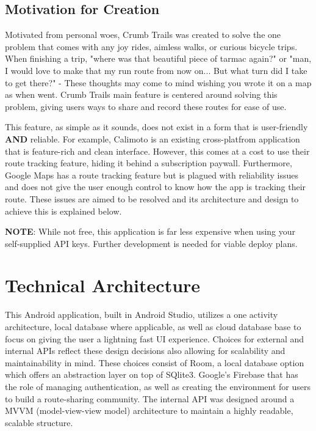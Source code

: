 \documentclass{article}
\begin{document}
            \newpage

        \subsection{Motivation for Creation}

            Motivated from personal woes, Crumb Trails was created to solve the one problem that comes
            with any joy rides, aimless walks, or curious bicycle trips. When finishing a trip, 
            "where was that beautiful piece of tarmac again?" or "man, I would love to make that my 
            run route from now on... But what turn did I take to get there?" - These thoughts may 
            come to mind wishing you wrote it on a map as when went. Crumb Trails main feature is
            centered around solving this problem, giving users ways to share and record these routes
            for ease of use.

            This feature, as simple as it sounds, does not exist in a form that is user-friendly
            \textbf{AND} reliable. For example, Calimoto is an existing cross-platfrom application
            that is feature-rich and clean interface. However, this comes at a cost to use their 
            route tracking feature, hiding it behind a subscription paywall. Furthermore, Google Maps
            has a route tracking feature but is plagued with reliability issues and does not give the 
            user enough control to know how the app is tracking their route. These issues are aimed to 
            be resolved and its architecture and design to achieve this is explained below.

            \textbf{NOTE}: While not free, this application is far less expensive when using your 
            self-supplied API keys. Further development is needed for viable deploy plans.

    \newpage

    \section{Technical Architecture}

        This Android application, built in Android Studio, utilizes a one activity architecture,
        local database where applicable, as well as cloud database base to focus on giving the user
        a lightning fast UI experience. Choices for external and internal APIs reflect these
        design decisions also allowing for scalability and maintainability in mind. These choices
        consist of Room, a local database option which offers an abstraction layer on top of SQlite3.
        Google's Firebase that has the role of managing authentication, as well as creating the 
        environment for users to build a route-sharing community. The internal API was designed 
        around a MVVM (model-view-view model) architecture to maintain a highly readable, scalable 
        structure.
\end{document}
